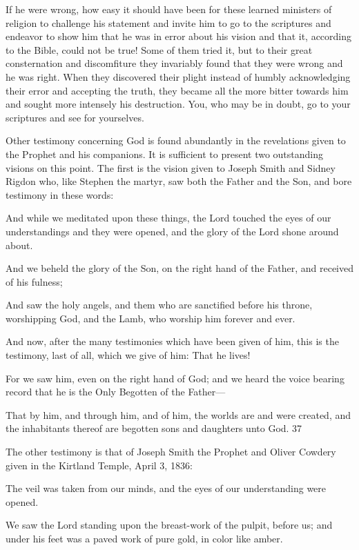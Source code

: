 If he were wrong, how easy it should have been for these learned ministers of religion to
challenge his statement and invite him to go to the scriptures and endeavor to show him that
he was in error about his vision and that it, according to the Bible, could not be true! Some of
them tried it, but to their great consternation and discomfiture they invariably found that they
were wrong and he was right. When they discovered their plight instead of humbly
acknowledging their error and accepting the truth, they became all the more bitter towards
him and sought more intensely his destruction. You, who may be in doubt, go to your
scriptures and see for yourselves.

Other testimony concerning God is found abundantly in the revelations given to the Prophet
and his companions. It is sufficient to present two outstanding visions on this point. The first
is the vision given to Joseph Smith and Sidney Rigdon who, like Stephen the martyr, saw
both the Father and the Son, and bore testimony in these words:

And while we meditated upon these things, the Lord touched the eyes of our understandings
and they were opened, and the glory of the Lord shone around about.

And we beheld the glory of the Son, on the right hand of the Father, and received of his
fulness;

And saw the holy angels, and them who are sanctified before his throne, worshipping God,
and the Lamb, who worship him forever and ever.

And now, after the many testimonies which have been given of him, this is the testimony,
last of all, which we give of him: That he lives!

For we saw him, even on the right hand of God; and we heard the voice bearing record that
he is the Only Begotten of the Father—

That by him, and through him, and of him, the worlds are and were created, and the
inhabitants thereof are begotten sons and daughters unto God. 37

The other testimony is that of Joseph Smith the Prophet and Oliver Cowdery given in the
Kirtland Temple, April 3, 1836:

The veil was taken from our minds, and the eyes of our understanding were opened.

We saw the Lord standing upon the breast-work of the pulpit, before us; and under his feet
was a paved work of pure gold, in color like amber.

